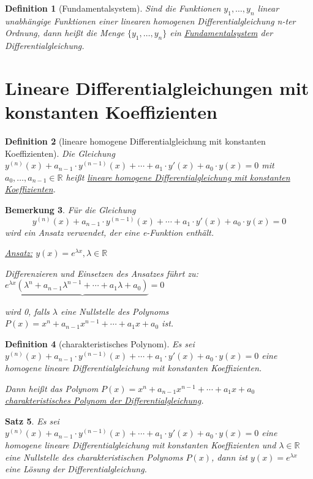 \documentclass[12pt,a4paper]{scrreprt}
\newtheorem{defi}{Definition}[section]
\newtheorem{bemerkung}[defi]{Bemerkung}
\newtheorem{satz}[defi]{Satz}
\begin{document}
	\begin{defi}[Fundamentalsystem]
		Sind die Funktionen $y_1,\dots,y_n$ linear unabhängige Funktionen einer linearen homogenen Differentialgleichung n-ter Ordnung, dann heißt die Menge $\{y_1,\dots,y_n\}$ ein \underline{Fundamentalsystem} der Differentialgleichung.
	\end{defi}

	\section{Lineare Differentialgleichungen mit konstanten Koeffizienten}

	\begin{defi}[lineare homogene Differentialgleichung mit konstanten Koeffizienten]
		Die Gleichung $y^{(n)}(x) + a_{n-1} \cdot y^{(n-1)}(x) + \cdots + a_1 \cdot y'(x) + a_0 \cdot y(x) = 0$ mit $a_0,\dots,a_{n-1} \in \mathbb{R}$ heißt \underline{lineare homogene Differentialgleichung mit konstanten Koeffizienten}.
	\end{defi}

	\begin{bemerkung}
		Für die Gleichung
		\[y^{(n)}(x) + a_{n-1} \cdot y^{(n-1)}(x) + \cdots + a_1 \cdot y'(x) + a_0 \cdot y(x) = 0\]
		wird ein Ansatz verwendet, der eine e-Funktion enthält.

		\underline{Ansatz:} $y(x)=e^{\lambda x},\lambda\in\mathbb{R}$

		Differenzieren und Einsetzen des Ansatzes führt zu: $e^{\lambda x}\underbrace{(\lambda^n+a_{n-1}\lambda^{n-1}+\cdots+a_1\lambda+a_0)}=0$
		
		wird 0, falls $\lambda$ eine Nullstelle des Polynoms $P(x)=x^n+a_{n-1}x^{n-1}+\cdots+a_1x+a_0$ ist.
	\end{bemerkung}

	\begin{defi}[charakteristisches Polynom]
		Es sei $y^{(n)}(x) + a_{n-1} \cdot y^{(n-1)}(x) + \cdots + a_1 \cdot y'(x) + a_0 \cdot y(x) = 0$ eine homogene lineare Differentialgleichung mit konstanten Koeffizienten.

		Dann heißt das Polynom $P(x)=x^n+a_{n-1}x^{n-1}+\cdots+a_1x+a_0$ \underline{charakteristisches Polynom der Differentialgleichung}.
	\end{defi}

	\begin{satz}
		Es sei $y^{(n)}(x) + a_{n-1} \cdot y^{(n-1)}(x) + \cdots + a_1 \cdot y'(x) + a_0 \cdot y(x) = 0$ eine homogene lineare Differentialgleichung mit konstanten Koeffizienten und $\lambda \in\mathbb{R}$ eine Nullstelle des charakteristischen Polynoms $P(x)$, dann ist $y(x)=e^{\lambda x}$ eine Lösung der Differentialgleichung.
	\end{satz}
\end{document}
